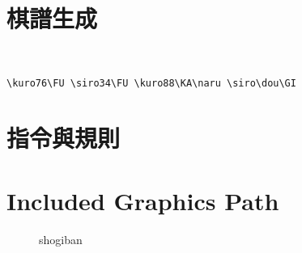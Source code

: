 \documentclass[a4paper, 10pt,]{article}
\begin{document}
\newpage
\section{棋譜生成}


\FU {}\FU {}\KA\naru {}\dou\GI\\



\begin{lstlisting}
\kuro76\FU \siro34\FU \kuro88\KA\naru \siro\dou\GI
\end{lstlisting}

\section{指令與規則}

\section{Included Graphics Path}


\begin{figure}[h]
  \centering
  \gazouka
  \gyakuban{
    \hirate
  }
  \caption{shogiban}
  \end{figure}

  
\end{document}
